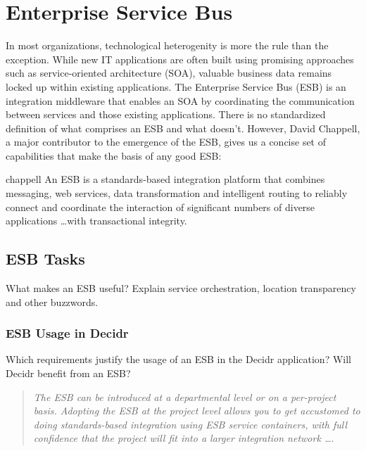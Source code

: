 %
%

\chapter{Enterprise Service Bus}
\label{chap:enterprise-service-bus}
In most organizations, technological heterogenity is more the rule than the
exception. While new IT applications are often built using promising approaches
such as service-oriented architecture (SOA), valuable business data remains
locked up within existing applications. The Enterprise Service Bus
(ESB) is an integration middleware that enables an SOA by coordinating the communication
between services and those existing applications.
There is no standardized definition of what comprises an ESB and what
doesn't\cite{wiki-de}. However, David Chappell, a major contributor to the
emergence of the ESB, gives us a concise set of capabilities that make the
basis of any good ESB: 

\begin{mycite}{chappell}
An ESB is a standards-based integration platform that
combines messaging, web services, data transformation and intelligent routing to
reliably connect and coordinate the interaction of significant numbers of
diverse applications \ldots with transactional integrity.
\end{mycite}


\section{ESB Tasks}
\label{sec:esb-tasks}
What makes an ESB useful? Explain service orchestration, location transparency
and other buzzwords.

\subsection{ESB Usage in Decidr}
\label{subsec:esb-usage-in-decidr}
Which requirements justify the usage of an ESB in the Decidr application? 
Will Decidr benefit from an ESB?

\begin{quotation}\emph{
The ESB can be introduced at a departmental level or on a
per-project basis. Adopting the ESB at the project level
allows you to get accustomed to doing standards-based
integration using ESB service containers, with full confidence
that the project will fit into a larger integration network
\ldots}\cite{chappell}.
\end{quotation}

